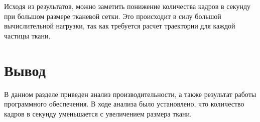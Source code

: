 Исходя из результатов, можно заметить понижение количества кадров в секунду при большом размере тканевой сетки. Это происходит в силу большой вычислительной нагрузки, так как требуется расчет траектории для каждой частицы ткани.

\section*{Вывод}
В данном разделе приведен анализ производительности, а также результат работы программного обеспечения. В ходе анализа было установлено, что количество кадров в секунду уменьшается с увеличением размера ткани.